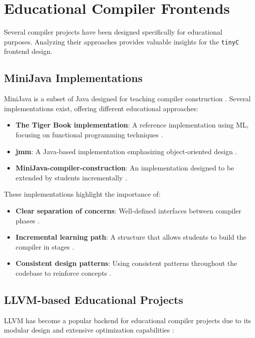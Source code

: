\section{Educational Compiler Frontends}

Several compiler projects have been designed specifically for educational purposes. Analyzing their approaches provides valuable insights for the \texttt{tinyC} frontend design.

\subsection{MiniJava Implementations}

MiniJava is a subset of Java designed for teaching compiler construction \cite{appel1998modern}. Several implementations exist, offering different educational approaches:

\begin{itemize}
    \item \textbf{The Tiger Book implementation}: A reference implementation using ML, focusing on functional programming techniques \cite{appel1998modern}.
    \item \textbf{jmm}: A Java-based implementation emphasizing object-oriented design \cite{patel2021comparing}.
    \item \textbf{MiniJava-compiler-construction}: An implementation designed to be extended by students incrementally \cite{patel2021comparing}.
\end{itemize}

These implementations highlight the importance of:
\begin{itemize}
    \item \textbf{Clear separation of concerns}: Well-defined interfaces between compiler phases \cite{appel1998modern}.
    \item \textbf{Incremental learning path}: A structure that allows students to build the compiler in stages \cite{patel2021comparing}.
    \item \textbf{Consistent design patterns}: Using consistent patterns throughout the codebase to reinforce concepts \cite{appel1998modern}.
\end{itemize}

\subsection{LLVM-based Educational Projects}

LLVM has become a popular backend for educational compiler projects due to its modular design and extensive optimization capabilities \cite{lattner2004llvm}:

